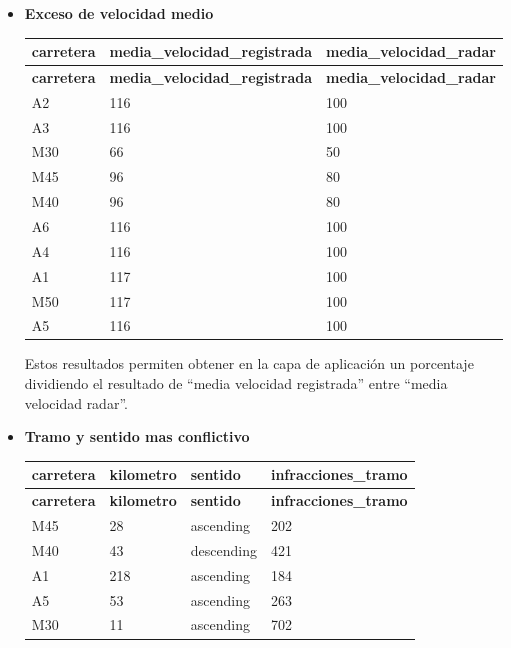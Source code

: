 \documentclass[]{article}
\begin{document}
\begin{itemize}
    \item \textbf{Exceso de velocidad medio}

\begin{table}[H]
\begin{longtable}{l l l}
    \hline
    \textbf{carretera} & \textbf{media\_velocidad\_registrada} & \textbf{media\_velocidad\_radar} \\ \hline
    \endfirsthead
    
    \hline
    \textbf{carretera} & \textbf{media\_velocidad\_registrada} & \textbf{media\_velocidad\_radar} \\ \hline
    \endhead
    
    A2 & 116 & 100 \\ \hline
    A3 & 116 & 100 \\ \hline
    M30 & 66 & 50 \\ \hline
    M45 & 96 & 80 \\ \hline
    M40 & 96 & 80 \\ \hline
    A6 & 116 & 100 \\ \hline
    A4 & 116 & 100 \\ \hline
    A1 & 117 & 100 \\ \hline
    M50 & 117 & 100 \\ \hline
    A5 & 116 & 100 \\ \hline
    
\end{longtable}
\end{table}

Estos resultados permiten obtener en la capa de aplicación un porcentaje dividiendo el resultado de ``media velocidad registrada'' entre ``media velocidad radar''. 

    \item \textbf{Tramo y sentido mas conflictivo}

\begin{table}[H]
\begin{longtable}{l l l l}
    \hline
    \textbf{carretera} & \textbf{kilometro} & \textbf{sentido} & \textbf{infracciones\_tramo} \\ \hline
    \endfirsthead
    
    \hline
    \textbf{carretera} & \textbf{kilometro} & \textbf{sentido} & \textbf{infracciones\_tramo} \\ \hline
    \endhead
    
    M45 & 28 & ascending & 202 \\ \hline
    M40 & 43 & descending & 421 \\ \hline
    A1 & 218 & ascending & 184 \\ \hline
    A5 & 53 & ascending & 263 \\ \hline
    M30 & 11 & ascending & 702 \\ \hline
    

\end{longtable}
\end{table}
\end{itemize}
\end{document}
